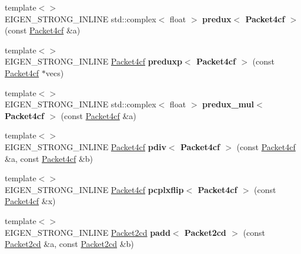 \begin{DoxyCompactItemize}
{\footnotesize template$<$$>$ }\\E\+I\+G\+E\+N\+\_\+\+S\+T\+R\+O\+N\+G\+\_\+\+I\+N\+L\+I\+NE std\+::complex$<$ float $>$ {\bfseries predux$<$ Packet4cf $>$} (const \hyperlink{struct_eigen_1_1internal_1_1_packet4cf}{Packet4cf} \&a)
\item 
\mbox{\label{namespace_eigen_1_1internal_aba832c112d719e488db8631939774dd6}} 
{\footnotesize template$<$$>$ }\\E\+I\+G\+E\+N\+\_\+\+S\+T\+R\+O\+N\+G\+\_\+\+I\+N\+L\+I\+NE \hyperlink{struct_eigen_1_1internal_1_1_packet4cf}{Packet4cf} {\bfseries preduxp$<$ Packet4cf $>$} (const \hyperlink{struct_eigen_1_1internal_1_1_packet4cf}{Packet4cf} $\ast$vecs)
\item 
\mbox{\label{namespace_eigen_1_1internal_a1e0ac9d18bc3b53250787e6b98f73b12}} 
{\footnotesize template$<$$>$ }\\E\+I\+G\+E\+N\+\_\+\+S\+T\+R\+O\+N\+G\+\_\+\+I\+N\+L\+I\+NE std\+::complex$<$ float $>$ {\bfseries predux\+\_\+mul$<$ Packet4cf $>$} (const \hyperlink{struct_eigen_1_1internal_1_1_packet4cf}{Packet4cf} \&a)
\item 
\mbox{\label{namespace_eigen_1_1internal_aa57b26f09f6cb5025770f4cca97b3830}} 
{\footnotesize template$<$$>$ }\\E\+I\+G\+E\+N\+\_\+\+S\+T\+R\+O\+N\+G\+\_\+\+I\+N\+L\+I\+NE \hyperlink{struct_eigen_1_1internal_1_1_packet4cf}{Packet4cf} {\bfseries pdiv$<$ Packet4cf $>$} (const \hyperlink{struct_eigen_1_1internal_1_1_packet4cf}{Packet4cf} \&a, const \hyperlink{struct_eigen_1_1internal_1_1_packet4cf}{Packet4cf} \&b)
\item 
\mbox{\label{namespace_eigen_1_1internal_ad52a3b1b94f53b88acfe2c3520568301}} 
{\footnotesize template$<$$>$ }\\E\+I\+G\+E\+N\+\_\+\+S\+T\+R\+O\+N\+G\+\_\+\+I\+N\+L\+I\+NE \hyperlink{struct_eigen_1_1internal_1_1_packet4cf}{Packet4cf} {\bfseries pcplxflip$<$ Packet4cf $>$} (const \hyperlink{struct_eigen_1_1internal_1_1_packet4cf}{Packet4cf} \&x)
\item 
\mbox{\label{namespace_eigen_1_1internal_aed5e53bef3b95b1e1100c0ab1c647c42}} 
{\footnotesize template$<$$>$ }\\E\+I\+G\+E\+N\+\_\+\+S\+T\+R\+O\+N\+G\+\_\+\+I\+N\+L\+I\+NE \hyperlink{struct_eigen_1_1internal_1_1_packet2cd}{Packet2cd} {\bfseries padd$<$ Packet2cd $>$} (const \hyperlink{struct_eigen_1_1internal_1_1_packet2cd}{Packet2cd} \&a, const \hyperlink{struct_eigen_1_1internal_1_1_packet2cd}{Packet2cd} \&b)

\end{DoxyCompactItemize}
